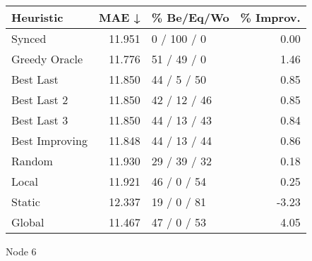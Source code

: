 \begin{tabular}{lrlr}
\toprule
\textbf{Heuristic} & \textbf{MAE ↓} & \textbf{\% Be/Eq/Wo} & \textbf{\% Improv.} \\
\midrule
            Synced &         11.951 &          0 / 100 / 0 &                0.00 \\
     Greedy Oracle &         11.776 &          51 / 49 / 0 &                1.46 \\
         Best Last &         11.850 &          44 / 5 / 50 &                0.85 \\
       Best Last 2 &         11.850 &         42 / 12 / 46 &                0.85 \\
       Best Last 3 &         11.850 &         44 / 13 / 43 &                0.84 \\
    Best Improving &         11.848 &         44 / 13 / 44 &                0.86 \\
            Random &         11.930 &         29 / 39 / 32 &                0.18 \\
             Local &         11.921 &          46 / 0 / 54 &                0.25 \\
            Static &         12.337 &          19 / 0 / 81 &               -3.23 \\
            Global &         11.467 &          47 / 0 / 53 &                4.05 \\
\bottomrule
\end{tabular}
\caption{Node 6}
\label{tab:ds_iid_lr05_le1_bs2_6}
